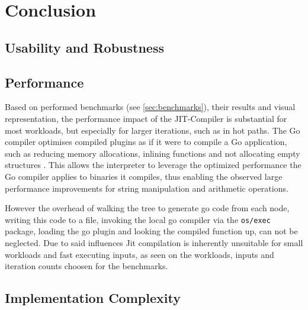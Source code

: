 \chapter{Conclusion}


\section{Usability and Robustness}


\section{Performance}

Based on performed benchmarks (see \autoref{sec:benchmarks}), their results and
visual representation, the performance impact of the JIT-Compiler is
substantial for most workloads, but especially for larger iterations, such as
in hot paths. The Go compiler optimises compiled plugins as if it were to
compile a Go application, such as reducing memory allocations\cite[Escape
Analysis]{go_wiki_optimization}, inlining
functions\cite[Inlining]{go_wiki_optimization} and not allocating empty
structures \cite[Interface Values]{go_wiki_optimization}. This allows the
interpreter to leverage the optimized performance the Go compiler applies to
binaries it compiles, thus enabling the observed large performance improvements
for string manipulation and arithmetic operations.

However the overhead of walking the tree to generate go code from each node,
writing this code to a file, invoking the local go compiler via the
\texttt{os/exec} package, loading the go plugin and looking the compiled
function up, can not be neglected. Due to said influences Jit compilation
is inherently unsuitable for small workloads and fast executing inputs, as seen
on the workloads, inputs and iteration counts choosen for the benchmarks. 

\section{Implementation Complexity}

